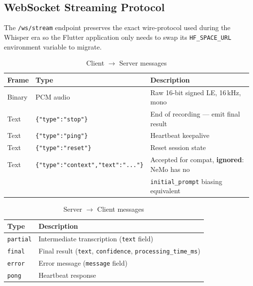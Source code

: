 \subsection{WebSocket Streaming Protocol}

The \texttt{/ws/stream} endpoint preserves the exact wire-protocol used during the Whisper era so the Flutter application only needs to swap its \texttt{HF\_SPACE\_URL} environment variable to migrate.

\begin{table}[H]
  \centering
  \caption{Client $\rightarrow$ Server messages}
  \label{tab:ws_client}
  \renewcommand{\arraystretch}{1.3}
  \begin{tabular}{llp{6.6cm}}
    \toprule
    \textbf{Frame} & \textbf{Type} & \textbf{Description} \\
    \midrule
    Binary & PCM audio & Raw 16-bit signed LE, 16\,kHz, mono \\
    Text & \texttt{\{"type":"stop"\}} & End of recording --- emit final result \\
    Text & \texttt{\{"type":"ping"\}} & Heartbeat keepalive \\
    Text & \texttt{\{"type":"reset"\}} & Reset session state \\
    Text & \texttt{\{"type":"context","text":"..."\}} & Accepted for compat, \textbf{ignored}: NeMo has no\\ & & \texttt{initial\_prompt} biasing equivalent \\
    \bottomrule
  \end{tabular}
\end{table}

\begin{table}[H]
  \centering
  \caption{Server $\rightarrow$ Client messages}
  \label{tab:ws_server}
  \renewcommand{\arraystretch}{1.3}
  \begin{tabular}{lp{8cm}}
    \toprule
    \textbf{Type} & \textbf{Description} \\
    \midrule
    \texttt{partial} & Intermediate transcription (\texttt{text} field) \\
    \texttt{final}   & Final result (\texttt{text}, \texttt{confidence}, \texttt{processing\_time\_ms}) \\
    \texttt{error}   & Error message (\texttt{message} field) \\
    \texttt{pong}    & Heartbeat response \\
    \bottomrule
  \end{tabular}
\end{table}

